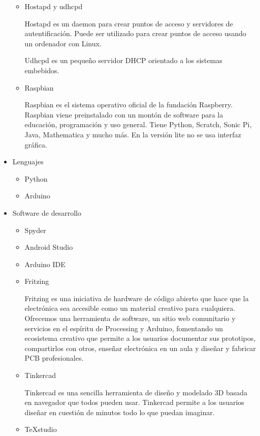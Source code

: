 \documentclass{pclass}
\begin{document}
\begin{itemize}
\begin{itemize}
		\item Hostapd y udhcpd
		
		Hostapd es un daemon para crear puntos de acceso y servidores de autentificación. Puede ser utilizado para crear puntos de acceso usando un ordenador con Linux. 
		
		Udhcpd es un pequeño servidor DHCP orientado a los sistemas embebidos.
		
			\cite{wireless}
		
		\item Raspbian	
		
		Raspbian es el sistema operativo oficial de la fundación Raspberry. Raspbian viene preinstalado con un montón de software para la educación, programación y uso general. Tiene Python, Scratch, Sonic Pi, Java, Mathematica y mucho más. En la versión lite no se usa interfaz gráfica.
		
			\cite{raspbian}
				
	\end{itemize}
	\item Lenguajes
		\begin{itemize}
			\item Python
			\item Arduino
		\end{itemize}
	\item Software de desarrollo
	\begin{itemize}
		\item Spyder
		\item Android Studio
		\item Arduino IDE
		\item Fritzing
		
		Fritzing es una iniciativa de hardware de código abierto que hace que la electrónica sea accesible como un material creativo para cualquiera. Ofrecemos una herramienta de software, un sitio web comunitario y servicios en el espíritu de Processing y Arduino, fomentando un ecosistema creativo que permite a los usuarios documentar sus prototipos, compartirlos con otros, enseñar electrónica en un aula y diseñar y fabricar PCB profesionales.
			\cite{fritzing}
		
		\item Tinkercad
		
		Tinkercad es una sencilla herramienta de diseño y modelado 3D basada en navegador que todos pueden usar. Tinkercad permite a los usuarios diseñar en cuestión de minutos todo lo que puedan imaginar.
			\cite{tinkercad}
			
		\item TeXstudio
		

\end{itemize}
\end{itemize}
\end{document}
